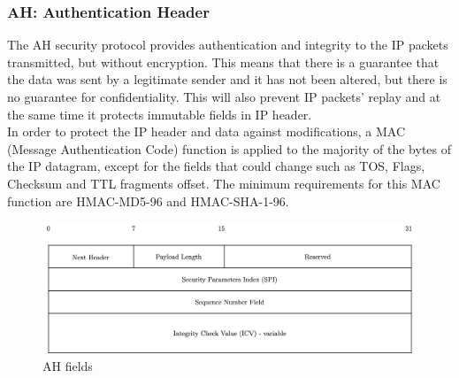 \documentclass[11pt]{book}
\begin{document}
\subsubsection{AH: Authentication Header}
The AH security protocol provides authentication and integrity to the IP packets transmitted, but without encryption. This means that there is a guarantee that the data was sent by a legitimate sender and it has not been altered, but there is no guarantee for confidentiality. This will also prevent IP packets' replay and at the same time it protects immutable fields in IP header.\\
In order to protect the IP header and data against modifications, a MAC (Message Authentication Code) function is applied to the majority of the bytes of the IP datagram, except for the fields that could change such as TOS, Flags, Checksum and TTL fragments offset. The minimum requirements for this MAC function are HMAC-MD5-96 and HMAC-SHA-1-96.
\begin{figure}[H]
	\centering
	\includegraphics [scale=0.175] {ah_fields.png}
	\caption{AH fields}
\end{figure}
\end{document}
